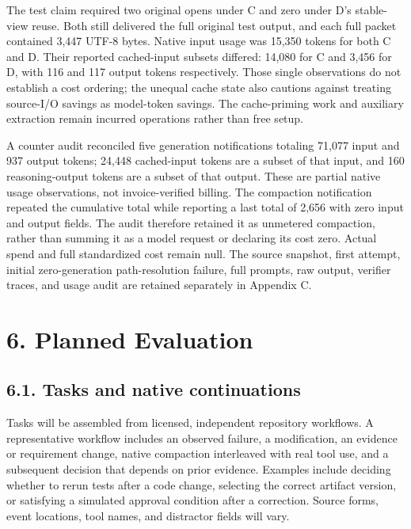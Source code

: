 \documentclass[
  11pt,
  a4paper,
]{article}
\begin{document}
The test claim required two original opens under C and zero under D's
stable-view reuse. Both still delivered the full original test output,
and each full packet contained 3,447 UTF-8 bytes. Native input usage was
15,350 tokens for both C and D. Their reported cached-input subsets
differed: 14,080 for C and 3,456 for D, with 116 and 117 output tokens
respectively. Those single observations do not establish a cost
ordering; the unequal cache state also cautions against treating
source-I/O savings as model-token savings. The cache-priming work and
auxiliary extraction remain incurred operations rather than free setup.

A counter audit reconciled five generation notifications totaling 71,077
input and 937 output tokens; 24,448 cached-input tokens are a subset of
that input, and 160 reasoning-output tokens are a subset of that output.
These are partial native usage observations, not invoice-verified
billing. The compaction notification repeated the cumulative total while
reporting a last total of 2,656 with zero input and output fields. The
audit therefore retained it as unmetered compaction, rather than summing
it as a model request or declaring its cost zero. Actual spend and full
standardized cost remain null. The source snapshot, first attempt,
initial zero-generation path-resolution failure, full prompts, raw
output, verifier traces, and usage audit are retained separately in
Appendix C.

\section{6. Planned Evaluation}\label{planned-evaluation}

\subsection{6.1. Tasks and native
continuations}\label{tasks-and-native-continuations}

Tasks will be assembled from licensed, independent repository workflows.
A representative workflow includes an observed failure, a modification,
an evidence or requirement change, native compaction interleaved with
real tool use, and a subsequent decision that depends on prior evidence.
Examples include deciding whether to rerun tests after a code change,
selecting the correct artifact version, or satisfying a simulated
approval condition after a correction. Source forms, event locations,
tool names, and distractor fields will vary.
\end{document}
